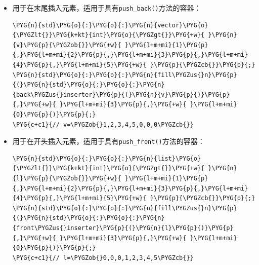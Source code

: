 \begin{itemize}
\item {}用于在末尾插入元素，适用于具有\texttt{push\_\allowbreak{}back()}方法的容器：



\begin{codeblockbg}
\begin{Verbatim}[commandchars=\\\{\},breaklines=true,breakanywhere=true,fontsize=\codefont,xleftmargin=17bp]
\PYG{n}{std}\PYG{o}{:}\PYG{o}{:}\PYG{n}{vector}\PYG{o}{\PYGZlt{}}\PYG{k+kt}{int}\PYG{o}{\PYGZgt{}}\PYG{+w}{ }\PYG{n}{v}\PYG{p}{\PYGZob{}}\PYG{+w}{ }\PYG{l+m+mi}{1}\PYG{p}{,}\PYG{l+m+mi}{2}\PYG{p}{,}\PYG{l+m+mi}{3}\PYG{p}{,}\PYG{l+m+mi}{4}\PYG{p}{,}\PYG{l+m+mi}{5}\PYG{+w}{ }\PYG{p}{\PYGZcb{}}\PYG{p}{;}
\PYG{n}{std}\PYG{o}{:}\PYG{o}{:}\PYG{n}{fill\PYGZus{}n}\PYG{p}{(}\PYG{n}{std}\PYG{o}{:}\PYG{o}{:}\PYG{n}{back\PYGZus{}inserter}\PYG{p}{(}\PYG{n}{v}\PYG{p}{)}\PYG{p}{,}\PYG{+w}{ }\PYG{l+m+mi}{3}\PYG{p}{,}\PYG{+w}{ }\PYG{l+m+mi}{0}\PYG{p}{)}\PYG{p}{;}
\PYG{c+c1}{// v=\PYGZob{}1,2,3,4,5,0,0,0\PYGZcb{}}
\end{Verbatim}
\end{codeblockbg}



\item {}用于在开头插入元素，适用于具有\texttt{push\_\allowbreak{}front()}方法的容器：



\begin{codeblockbg}
\begin{Verbatim}[commandchars=\\\{\},breaklines=true,breakanywhere=true,fontsize=\codefont,xleftmargin=17bp]
\PYG{n}{std}\PYG{o}{:}\PYG{o}{:}\PYG{n}{list}\PYG{o}{\PYGZlt{}}\PYG{k+kt}{int}\PYG{o}{\PYGZgt{}}\PYG{+w}{ }\PYG{n}{l}\PYG{p}{\PYGZob{}}\PYG{+w}{ }\PYG{l+m+mi}{1}\PYG{p}{,}\PYG{l+m+mi}{2}\PYG{p}{,}\PYG{l+m+mi}{3}\PYG{p}{,}\PYG{l+m+mi}{4}\PYG{p}{,}\PYG{l+m+mi}{5}\PYG{+w}{ }\PYG{p}{\PYGZcb{}}\PYG{p}{;}
\PYG{n}{std}\PYG{o}{:}\PYG{o}{:}\PYG{n}{fill\PYGZus{}n}\PYG{p}{(}\PYG{n}{std}\PYG{o}{:}\PYG{o}{:}\PYG{n}{front\PYGZus{}inserter}\PYG{p}{(}\PYG{n}{l}\PYG{p}{)}\PYG{p}{,}\PYG{+w}{ }\PYG{l+m+mi}{3}\PYG{p}{,}\PYG{+w}{ }\PYG{l+m+mi}{0}\PYG{p}{)}\PYG{p}{;}
\PYG{c+c1}{// l=\PYGZob{}0,0,0,1,2,3,4,5\PYGZcb{}}
\end{Verbatim}
\end{codeblockbg}



\end{itemize}
